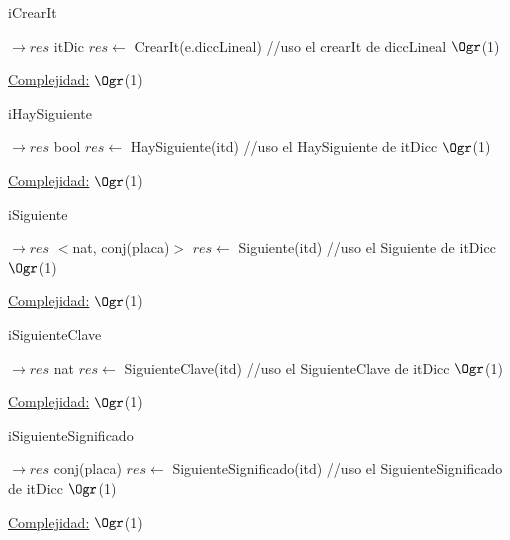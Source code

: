 \begin{Representacion}
\begin{Algoritmos}
\begin{algorithm}[H]
	\end{algorithm}
	
	\begin{algorithm}[H]
		\caption{iCrearIt}
		
		\begin{algorithmic}[1]
			 $\to res$ itDic
			\State $res \leftarrow$ CrearIt(e.diccLineal) //uso el crearIt de diccLineal \Comment $\Ogr$(1)
			\EndProcedure 
		\end{algorithmic}
		\underline{Complejidad:} $\Ogr$(1)
	\end{algorithm}
	
	\begin{algorithm}[H]
		\caption{iHaySiguiente}
		
		\begin{algorithmic}[1]
			 $\to res$ bool
			\State $res \leftarrow$ HaySiguiente(itd) //uso el HaySiguiente de itDicc \Comment $\Ogr$(1)
			\EndProcedure 
		\end{algorithmic}
		\underline{Complejidad:} $\Ogr$(1)
	\end{algorithm}
	
	\begin{algorithm}[H]
		\caption{iSiguiente}
		
		\begin{algorithmic}[1]
			 $\to res$ $<$nat, conj(placa)$>$
			\State $res \leftarrow$ Siguiente(itd) //uso el Siguiente de itDicc \Comment $\Ogr$(1)
			\EndProcedure 
		\end{algorithmic}
		\underline{Complejidad:} $\Ogr$(1)
	\end{algorithm}
	
	\begin{algorithm}[H]
		\caption{iSiguienteClave}
		
		\begin{algorithmic}[1]
			 $\to res$ nat
			\State $res \leftarrow$ SiguienteClave(itd) //uso el SiguienteClave de itDicc \Comment $\Ogr$(1)
			\EndProcedure 
		\end{algorithmic}
		\underline{Complejidad:} $\Ogr$(1)
	\end{algorithm}
	
	\begin{algorithm}[H]
		\caption{iSiguienteSignificado}
		
		\begin{algorithmic}[1]
			 $\to res$ conj(placa)
			\State $res \leftarrow$ SiguienteSignificado(itd) //uso el SiguienteSignificado de itDicc \Comment $\Ogr$(1)
			\EndProcedure 
		\end{algorithmic}
		\underline{Complejidad:} $\Ogr$(1)
	\end{algorithm}
	

\end{Algoritmos}
\end{Representacion}
